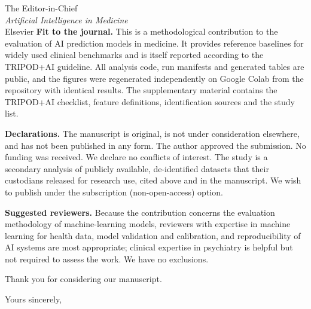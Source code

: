\documentclass[11pt,a4paper]{letter}
\begin{document}
\begin{letter}{The Editor-in-Chief\\\emph{Artificial Intelligence in Medicine}\\Elsevier}
\textbf{Fit to the journal.} This is a methodological contribution to the evaluation of AI
prediction models in medicine. It provides reference baselines for widely used clinical
benchmarks and is itself reported according to the TRIPOD+AI guideline. All analysis code, run
manifests and generated tables are public, and the figures were regenerated independently on
Google Colab from the repository with identical results. The supplementary material contains the
TRIPOD+AI checklist, feature definitions, identification sources and the study list.

\textbf{Declarations.} The manuscript is original, is not under consideration elsewhere, and has
not been published in any form. The author approved the submission. No funding was received. We
declare no conflicts of interest. The study is a secondary analysis of publicly available,
de-identified datasets that their custodians released for research use, cited above and in the
manuscript. We wish to publish under the subscription (non-open-access) option.

\textbf{Suggested reviewers.} Because the contribution concerns the evaluation methodology of
machine-learning models, reviewers with expertise in machine learning for health data, model
validation and calibration, and reproducibility of AI systems are most appropriate; clinical
expertise in psychiatry is helpful but not required to assess the work. We have no exclusions.

Thank you for considering our manuscript.

\closing{Yours sincerely,}
\end{letter}
\end{document}
